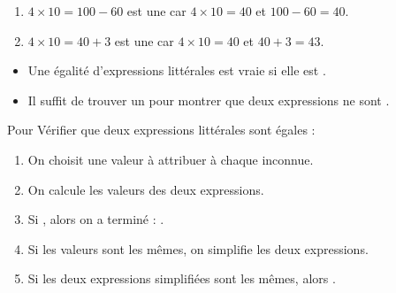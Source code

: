 \documentclass[12pt,a4paper]{article}
\begin{document}
\begin{myexs}
	\begin{enumerate}
		\item $4 \times 10 = 100 - 60$ est une  car $4 \times 10 = 40 $ et $100 - 60 = 40$.
		
		
		\item $4 \times 10 = 40 + 3$ est une  car $4 \times 10 = 40 $ et $40 + 3 = 43$.
	\end{enumerate}
\end{myexs}

\begin{myprops}
	\begin{itemize}
		\item Une égalité d'expressions littérales est vraie si elle est .
		
		\item Il suffit de trouver un  pour montrer que deux expressions ne sont .	
	\end{itemize}	
\end{myprops}


\begin{mymeth}
	Pour Vérifier que deux expressions littérales sont égales :
	
	\begin{enumerate}
		\item On choisit une valeur à attribuer à chaque inconnue.
		\item On calcule les valeurs des deux expressions.
		\item Si , alors on a terminé : .
		\item Si les valeurs sont les mêmes, on simplifie les deux expressions.
		\item Si les deux expressions simplifiées sont les mêmes, alors .
	\end{enumerate} 
\end{mymeth}
\end{document}
